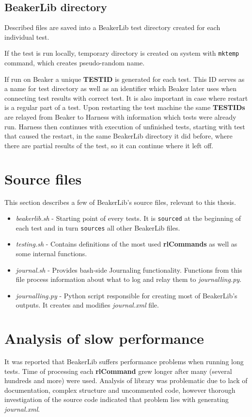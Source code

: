 \subsection{BeakerLib directory}
\label{beakerlib_dir}
Described files are saved into a BeakerLib test directory created for each individual test. 

If the test is run locally, temporary directory is created on system with \texttt{mktemp} command, which creates pseudo-random name.

If run on Beaker a unique \textbf{TESTID} is generated for each test. This ID serves as a name for test directory as well as an identifier which Beaker later uses when connecting test results with correct test. It is also important in case where restart is a regular part of a test. Upon restarting the test machine the same \textbf{TESTIDs} are relayed from Beaker to Harness with information which tests were already run. Harness then continues with execution of unfinished tests, starting with test that caused the restart, in the same BeakerLib directory it did before, where there are partial results of the test, so it can continue where it left off.

\section{Source files}
This section describes a few of BeakerLib's source files, relevant to this thesis.
\begin{itemize}
\item \textit{beakerlib.sh} - Starting point of every tests. It is \texttt{sourced} at the beginning of each test and in turn \texttt{sources} all other BeakerLib files.
\item \textit{testing.sh} - Contains definitions of the most used \textbf{rlCommands} as well as some internal functions.
\item \textit{journal.sh} - Provides bash-side Journaling functionality. Functions from this file process information about what to log and relay them to \textit{journalling.py}.
\item \textit{journalling.py} - Python script responsible for creating most of BeakerLib's outputs. It creates and modifies \textit{journal.xml} file.
\end{itemize}

\section{Analysis of slow performance}
It was reported that BeakerLib suffers performance problems when running long tests. Time of processing each \textbf{rlCommand} grew longer after many (several hundreds and more) were used. Analysis of library was problematic due to lack of documentation, complex structure and uncommented code, however thorough investigation of the source code indicated that problem lies with generating \textit{journal.xml}. 

